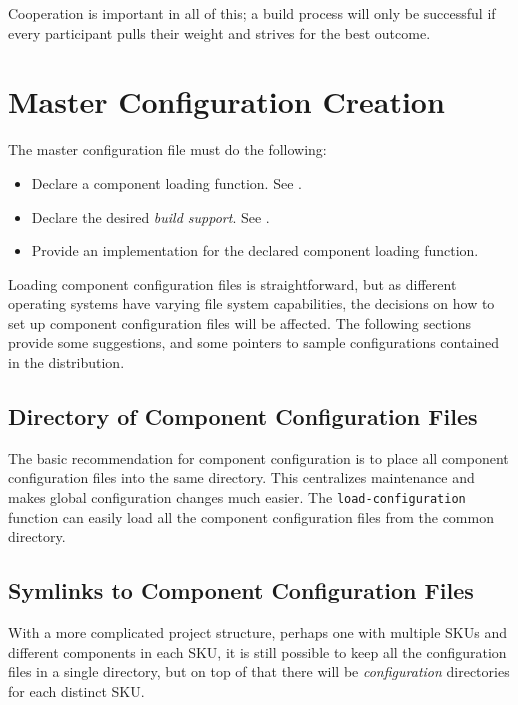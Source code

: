 Cooperation is important in all of this; a build process will only be
successful if every participant pulls their weight and strives for the
best outcome.

\section{Master Configuration Creation}\label{wrap:master-configuration}

The master configuration file must do the following:

\begin{itemize}
\item Declare a component loading function.  See
  .
\item Declare the desired \emph{build support}.  See
  .
\item Provide an implementation for the declared component loading
  function.
\end{itemize}

Loading component configuration files is straightforward, but as
different operating systems have varying file system capabilities, the
decisions on how to set up component configuration files will be
affected.  The following sections provide some suggestions, and some
pointers to sample configurations contained in the \lmsbw
distribution.

\subsection{Directory of Component Configuration Files}\label{wrap:directory}

The basic recommendation for \lmsbw component configuration is to
place all component configuration files into the same directory.  This
centralizes maintenance and makes global configuration changes much
easier.  The \texttt{load-configuration} function can easily load all
the component configuration files from the common directory.

\subsection{Symlinks to Component Configuration Files}

With a more complicated project structure, perhaps one with multiple
SKUs and different components in each SKU, it is still possible to
keep all the configuration files in a single directory, but on top of
that there will be \emph{configuration} directories for each distinct
SKU.

